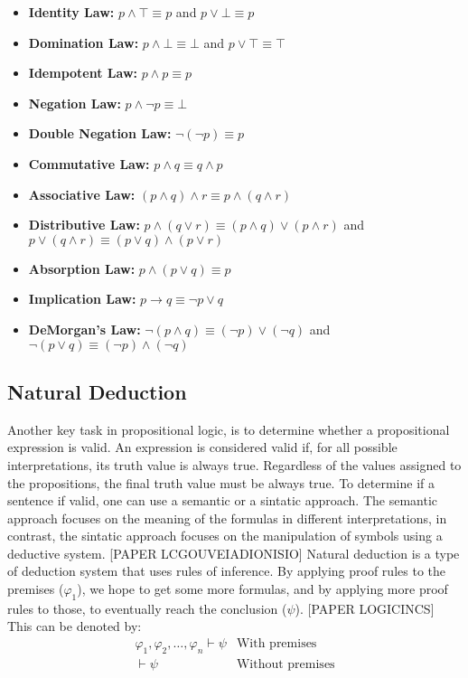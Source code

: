 \begin{itemize}
    \begin{itemize}
        \item \textbf{Identity Law:} \( p \land \top \equiv p \) and \( p \lor \bot \equiv p \)
        \item \textbf{Domination Law:} \( p \land \bot \equiv \bot \) and \( p \lor \top \equiv \top \) 
        \item \textbf{Idempotent Law:} \( p \land p \equiv p \)
        \item \textbf{Negation Law:} \( p \land \neg p \equiv \bot \)
        \item \textbf{Double Negation Law:} \( \neg (\neg p) \equiv p \)
        \item \textbf{Commutative Law:} \( p \land q \equiv q \land p \)
        \item \textbf{Associative Law:} \( (p \land q) \land r \equiv p \land (q \land r) \)
        \item \textbf{Distributive Law:} \( p \land (q \lor r) \equiv (p \land q) \lor (p \land r) \) and \( p \lor (q \land r) \equiv (p\lor q) \land (p \lor r) \)
        \item \textbf{Absorption Law:} \( p \land (p \lor q) \equiv p \)
        \item \textbf{Implication Law:} \( p \to q \equiv \neg p \lor q \)
        \item \textbf{DeMorgan’s Law:} \( \neg (p \land q) \equiv (\neg p) \lor (\neg q) \) and \( \neg (p \lor q) \equiv (\neg p) \land (\neg q) \)
    \end{itemize}
        
\end{itemize}



\subsection{Natural Deduction} 
Another key task in propositional logic, is to determine whether a propositional expression is valid. An expression is considered valid if, for all possible interpretations, its truth value is always true. Regardless of the values assigned to the propositions, the final truth value must be always true. To determine if a sentence if valid, one can use a semantic or a sintatic approach. The semantic approach focuses on the meaning of the formulas in different interpretations, in contrast, the sintatic approach focuses on the manipulation of symbols using a deductive system.
[PAPER LCGOUVEIADIONISIO] Natural deduction is a type of deduction system that uses rules of inference. By applying proof rules to the premises (\(\varphi_1\)), we hope to get some more formulas, and by applying more proof rules to those, to eventually reach the conclusion (\(\psi\)). [PAPER LOGICINCS] This can be denoted by:
\[
\begin{array}{lcl}
\varphi_1, \varphi_2, \dots, \varphi_n \vdash \psi & \text{With premises} \\
\vdash \psi & \text{Without premises}
\end{array}
\]

